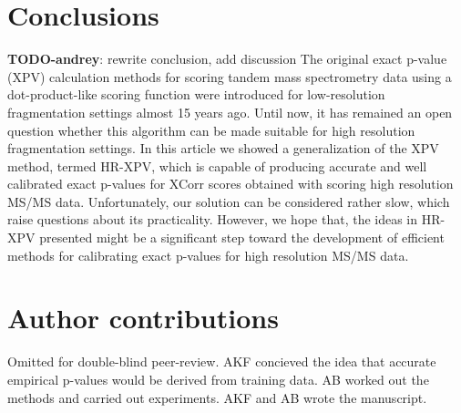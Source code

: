 \documentclass{article}
\newcommand{\todo}[2]{{\color{red} {\bf TODO-#1}: #2}}
\begin{document}
\section{Conclusions}
\todo{andrey}{rewrite conclusion, add discussion}
The original exact p-value (XPV) calculation methods for scoring tandem mass spectrometry data using a dot-product-like scoring function were introduced for low-resolution fragmentation settings almost 15 years ago. Until now, it has remained an open question whether this algorithm can be made suitable for high resolution fragmentation settings. In this article we showed a generalization of the XPV method, termed HR-XPV, which is capable of producing accurate and well calibrated exact p-values for XCorr scores obtained with scoring high resolution MS/MS data. Unfortunately, our solution can be considered rather slow, which raise questions about its practicality. However, we hope that, the ideas in HR-XPV presented might be a significant step toward the development of efficient methods for calibrating exact p-values for high resolution MS/MS data. 

\section*{Author contributions}
\ifdefined\DOUBLEBLINDREVIEW
Omitted for double-blind peer-review.
\else
AKF concieved the idea that accurate empirical p-values would be derived from training data. AB worked out the methods and carried out experiments. AKF and AB wrote the manuscript.
\fi


\end{document}
